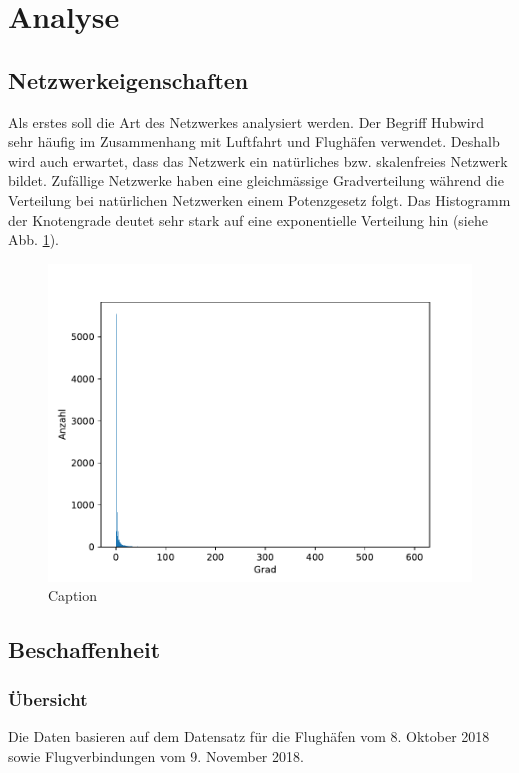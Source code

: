 \section{Analyse}
\label{sec:Analysis}


\subsection{Netzwerkeigenschaften}
\label{sec:overview-numbers}
Als erstes soll die Art des Netzwerkes analysiert werden. Der Begriff \guillemotleft Hub\guillemotright wird sehr
häufig im Zusammenhang mit Luftfahrt und Flughäfen verwendet.
Deshalb wird auch erwartet, dass das Netzwerk ein natürliches bzw. skalenfreies Netzwerk bildet.
Zufällige Netzwerke haben eine gleichmässige Gradverteilung während die Verteilung bei natürlichen Netzwerken einem
Potenzgesetz folgt.
Das Histogramm der Knotengrade deutet sehr stark auf eine exponentielle Verteilung hin (siehe Abb. \ref{fig:degreeHistogram}).

\begin{figure}
    \centering
    \includegraphics[width=0.75\linewidth]{images/degree-histogram.pdf}
    \caption{Caption}
    \label{fig:degreeHistogram}
\end{figure}

\subsection{Beschaffenheit}

\subsubsection{Übersicht}

Die Daten basieren auf dem Datensatz für die Flughäfen vom 8. Oktober 2018 sowie Flugverbindungen vom 9. November 2018.


